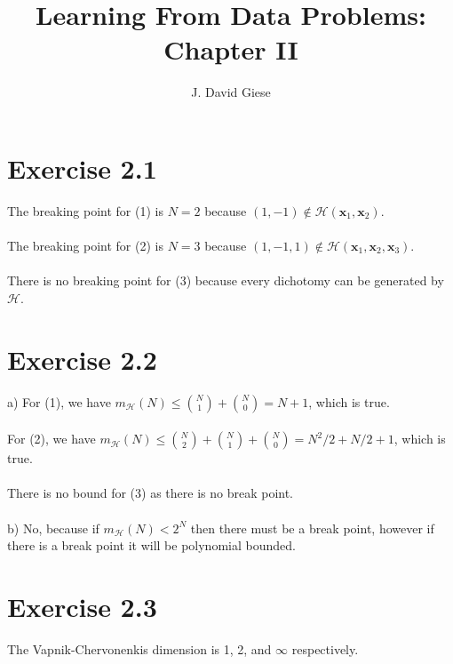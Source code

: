 \documentclass[11pt,letterpaper]{article}
\title{Learning From Data Problems: Chapter II}
\date{}
\author{J. David Giese}
\newcommand{\vv}[1]{\mathbf{#1}} %
\begin{document}
\maketitle

\section*{Exercise 2.1}
The breaking point for (1) is $N = 2$ because $(1, -1) \not\in \mathcal{H}(\vv{x}_1, \vv{x}_2)$.
\\\\
The breaking point for (2) is $N = 3$ because $(1, -1, 1) \not\in \mathcal{H}(\vv{x}_1, \vv{x}_2, \vv{x}_3)$.
\\\\
There is no breaking point for (3) because every dichotomy can be generated by $\mathcal{H}$.

\section*{Exercise 2.2}

a) For (1), we have $m_\mathcal{H}(N) \le \binom{N}{1} + \binom{N}{0} = N + 1$, which is true.
\\\\
For (2), we have $m_\mathcal{H}(N) \le \binom{N}{2} + \binom{N}{1} + \binom{N}{0} = N^2/2 + N/2 + 1$, which is true.
\\\\
There is no bound for (3) as there is no break point.
\\\\
b) No, because if $m_\mathcal{H}(N) < 2^N$ then there must be a break point, however if there is a break point it will be polynomial bounded.

\section*{Exercise 2.3}
The Vapnik-Chervonenkis dimension is 1, 2, and $\infty$ respectively.
\end{document}
